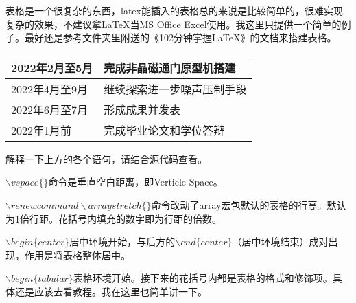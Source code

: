 表格是一个很复杂的东西，latex能插入的表格总的来说是比较简单的，很难实现复杂的效果，不建议拿LaTeX当MS Office Excel使用。我这里只提供一个简单的例子。最好还是参考文件夹里附送的《102分钟掌握LaTeX》的文档来搭建表格。
\vspace{0.3cm}
\renewcommand\arraystretch{1.7}
\begin{center}
\begin{tabular}{>{\raggedleft\arraybackslash}p{110pt}|>{\raggedright\arraybackslash}p{165pt}}
	\hline
	2022年2月至5月&完成非晶磁通门原型机搭建\\
	\hline
	2022年4月至9月&继续探索进一步噪声压制手段\\
	\hline
	2022年6月至7月&形成成果并发表\\
	\hline
	2022年1月前&完成毕业论文和学位答辩\\
	\hline
\end{tabular}
\end{center}
\vspace{0.3cm}\par
解释一下上方的各个语句，请结合源代码查看。\par
$\backslash vspace\{\}$命令是垂直空白距离，即Verticle Space。\par
$\backslash renewcommand\backslash arraystretch\{\}$命令改动了array宏包默认的表格的行高。默认为1倍行距。花括号内填充的数字即为行距的倍数。\par
$\backslash begin\{center\}$居中环境开始，与后方的$\backslash end\{center\}$（居中环境结束）成对出现，作用是将表格整体居中。\par
$\backslash begin\{tabular\}$表格环境开始。接下来的花括号内都是表格的格式和修饰项。具体还是应该去看教程。我在这里也简单讲一下。
